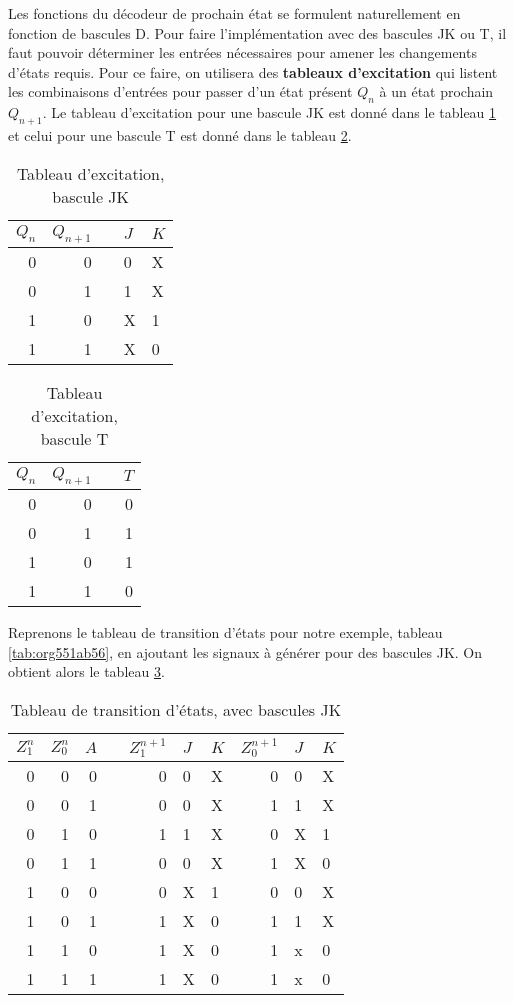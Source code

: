 \documentclass[11pt]{article}
\begin{document}
Les fonctions du décodeur de prochain état se formulent naturellement
en fonction de bascules D.  Pour faire l'implémentation avec des
bascules JK ou T, il faut pouvoir déterminer les entrées nécessaires
pour amener les changements d'états requis. Pour ce faire, on
utilisera des \textbf{tableaux d'excitation} qui listent les combinaisons
d'entrées pour passer d'un état présent \(Q_n\) à un état prochain
\(Q_{n+1}\). Le tableau d'excitation pour une bascule JK est donné
dans le tableau \ref{tab:org2a95cfe} et celui pour une bascule T est donné
dans le tableau \ref{tab:org1583113}.

\begin{table}[htbp]
\caption{\label{tab:org2a95cfe}Tableau d'excitation, bascule JK}
\centering
\begin{tabular}{rrlll}
\(Q_n\) & \(Q_{n+1}\) &  & \(J\) & \(K\)\\
\hline
0 & 0 &  & 0 & X\\
0 & 1 &  & 1 & X\\
1 & 0 &  & X & 1\\
1 & 1 &  & X & 0\\
\end{tabular}
\end{table}

\begin{table}[htbp]
\caption{\label{tab:org1583113}Tableau d'excitation, bascule T}
\centering
\begin{tabular}{rrlr}
\(Q_n\) & \(Q_{n+1}\) &  & \(T\)\\
\hline
0 & 0 &  & 0\\
0 & 1 &  & 1\\
1 & 0 &  & 1\\
1 & 1 &  & 0\\
\end{tabular}
\end{table}

Reprenons le tableau de transition d'états pour notre exemple, tableau
\ref{tab:org551ab56}, en ajoutant les signaux à générer pour des
bascules JK. On obtient alors le tableau \ref{tab:orge4f9dd9}.

\begin{table}[htbp]
\caption{\label{tab:orge4f9dd9}Tableau de transition d'états, avec bascules JK}
\centering
\begin{tabular}{rrrlrllrll}
\(Z_1^n\) & \(Z_0^n\) & \(A\) &  & \(Z_1^{n+1}\) & \(J\) & \(K\) & \(Z_0^{n+1}\) & \(J\) & \(K\)\\
\hline
0 & 0 & 0 &  & 0 & 0 & X & 0 & 0 & X\\
0 & 0 & 1 &  & 0 & 0 & X & 1 & 1 & X\\
0 & 1 & 0 &  & 1 & 1 & X & 0 & X & 1\\
0 & 1 & 1 &  & 0 & 0 & X & 1 & X & 0\\
1 & 0 & 0 &  & 0 & X & 1 & 0 & 0 & X\\
1 & 0 & 1 &  & 1 & X & 0 & 1 & 1 & X\\
1 & 1 & 0 &  & 1 & X & 0 & 1 & x & 0\\
1 & 1 & 1 &  & 1 & X & 0 & 1 & x & 0\\
\end{tabular}
\end{table}
\end{document}
